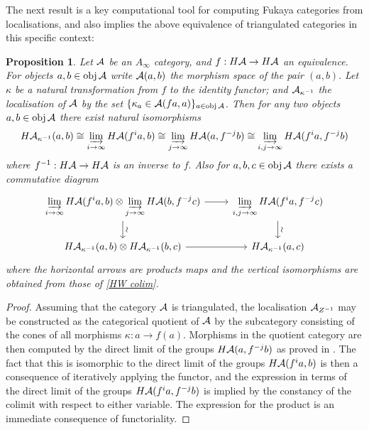 \documentclass{article}
\theoremstyle{plain}%
\newtheorem{prop}[thm]{Proposition}
\theoremstyle{definition}
\numberwithin{equation}{section}
\numberwithin{figure}{section}
\def\eq{\eqref}
\def\l{\label}
\def\cA{{\mathbin{\cal A}}}
\def\ot{\otimes}
\def\iy{\infty}
\begin{document}
The next result is a key computational tool for computing Fukaya categories from localisations, and also implies the above equivalence of triangulated categories in this specific context:
\begin{prop}\l{prop: loc}
Let $\cA$ be an $A_\iy$ category,
and $f:H\cA\to H\cA$ an equivalence.
For objects $a,b\in\obj\cA$ write $\cA(a,b)$ the morphism space of the pair $(a,b).$
Let $\kappa$ be a natural transformation from $f$ to the identity functor;
and $\cA_{\kappa^{-1}}$ the localisation of $\cA$ by the set $\{\kappa_a \in \cA(fa,a)\}_{a\in\obj\cA}$.
Then for any two objects $a,b\in\obj\cA$ there exist natural isomorphisms
\begin{multline}
  \l{HW colim}
H\cA_{\kappa^{-1}}(a,b)\cong \dirlim_{i\to\iy} H\cA(f^ia,b) \cong 
 \dirlim_{j\to\iy} H\cA(a,f^{-j}b)
\cong \dirlim_{i,j\to\iy} H\cA(f^ia,f^{-j}b)    
\end{multline}
where $f^{-1}:H\cA\to H\cA$ is an inverse to $f.$
Also for $a,b,c\in\obj\cA$ there exists a commutative diagram
\begin{equation}\l{products in HW}
\begin{tikzcd}
\dirlim_{i\to\iy}H\cA(f^ia,b)\ot\dirlim_{j\to\iy}H\cA(b,f^{-j}c)\ar[r]\ar[d,"\rotatebox{270}{$\sim$}"]&
\displaystyle
\dirlim_{i,j\to\iy}H\cA(f^ia,f^{-j}c)\ar[d,"\rotatebox{270}{$\sim$}"]\\
\displaystyle
H\cA_{\kappa^{-1}}(a,b)\ot H\cA_{\kappa^{-1}}(b,c)\ar[r]& H\cA_{\kappa^{-1}}(a,c)
\end{tikzcd}
\end{equation}
where the horizontal arrows are products maps and the vertical isomorphisms are obtained from those of \eq{HW colim}.
\end{prop}
\begin{proof}
Assuming that the category $ \cA$ is triangulated, the localisation $\cA_{Z^{-1}} $  may be constructed as the categorical quotient of $\cA$ by the subcategory consisting of the cones of all morphisms $\kappa : a \to f(a)$.  Morphisms in the quotient category are then computed by the direct limit of the groups $H\cA(a,f^{-j}b) $ as proved in \cite[Lemma 7.18]{SeidLec}. The fact that this is isomorphic to the direct limit of the groups $H\cA(f^ia,b) $ is then a consequence of iteratively applying the functor, and the expression in terms of the direct limit of the groups $H\cA(f^ia,f^{-j}b)$ is implied by the constancy of the colimit with respect to either variable. The expression for the product is an immediate consequence of functoriality. 
\end{proof}
\end{document}
